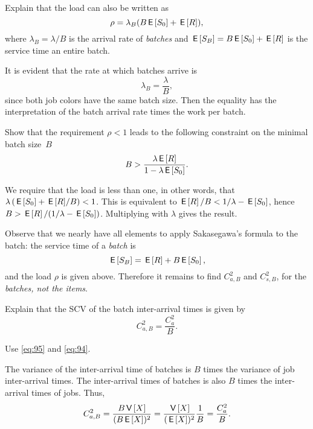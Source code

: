\begin{exercise}
Explain that the load can also be written as
\begin{equation*}
\rho = \lambda_B (B \,\mathsf{E}\left[S_0\right] + \,\mathsf{E}\left[R\right]),
\end{equation*}
where $\lambda_B=\lambda/B$ is the arrival rate of \emph{batches} and $\,\mathsf{E}\left[S_B\right] = B \,\mathsf{E}\left[S_0\right] + \,\mathsf{E}\left[R\right]$ is the service time an entire batch.
\begin{solution}
It is evident that the rate at which batches arrive is 
\begin{equation*}
 \lambda_B = \frac \lambda B,
\end{equation*}
since both job colors have the same batch size. 
Then the equality has the interpretation of the batch arrival rate times the work per batch.
\end{solution}
\end{exercise}

\begin{exercise}
Show that the requirement $\rho < 1$ leads to the following constraint on the minimal batch size~$B$ 
 \begin{equation*}
 B>\frac{\lambda \,\mathsf{E}\left[R\right]}{1-\lambda \,\mathsf{E}\left[S_0\right]}.
 \end{equation*}
\begin{solution}
 We require that the load is less than one, in other words, that $\lambda\left(\,\mathsf{E}\left[S_0\right] + {\,\mathsf{E}\left[R\right]}/B\right) < 1$. This is equivalent to $\,\mathsf{E}\left[R\right]/B < 1/\lambda - \,\mathsf{E}\left[S_0\right]$, hence $B > \,\mathsf{E}\left[R\right]/(1/\lambda - \,\mathsf{E}\left[S_0\right])$. Multiplying with $\lambda$ gives the result. 
\end{solution}
\end{exercise}

Observe that we nearly have all elements to apply Sakasegawa's formula to the batch: the service time of a \emph{batch} is
\begin{equation}
  \label{eq:90}
\,\mathsf{E}\left[S_B\right] = \,\mathsf{E}\left[R\right] + B\,\mathsf{E}\left[S_0\right],
\end{equation}
and the load $\rho$ is given above.
Therefore it remains to find $C_{a,B}^2$ and $C_{s,B}^2$, for the \emph{batches, not the items}.

\begin{exercise}
Explain that the SCV of the batch inter-arrival times is given by
 \begin{equation}\label{eq:82}
C_{a,B}^2 = \frac{C_{a}^2}B.
\end{equation}
\begin{hint}
Use \cref{eq:95} and \cref{eq:94}.
\end{hint}
\begin{solution}
The variance of the inter-arrival time of batches is $B$ times the variance of job inter-arrival times. The inter-arrival times of batches is also $B$ times the inter-arrival times of jobs. Thus, 
\begin{equation*}
 C_{a,B}^2 = \frac{B \,\mathsf{V}\left[X\right]}{(B \,\mathsf{E}\left[X\right])^2} = \frac{\,\mathsf{V}\left[X\right]}{(\,\mathsf{E}\left[X\right])^2} \frac 1 B = \frac{C_a^2}{B}.
\end{equation*}
\end{solution}
\end{exercise}


